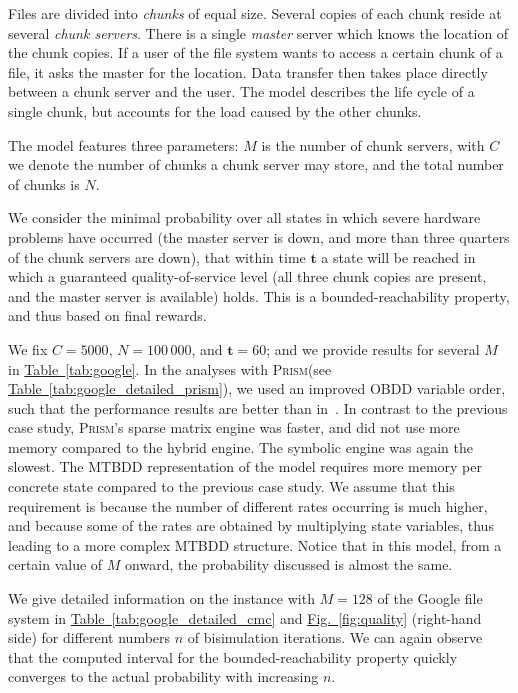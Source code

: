 \documentclass[10pt,twocolumn]{article}
\newcommand{\PRISM}{\textsc{Prism}\xspace}
\newcommand{\timeb}{\mathbf{t}}
\newcommand{\reffig}[1]{\texorpdfstring{\hyperref[fig:#1]{Fig.~\ref*{fig:#1}}}{Fig.~\ref*{fig:#1}}}
\newcommand{\reftab}[1]{\texorpdfstring{\hyperref[tab:#1]{Table~\ref*{tab:#1}}}{Table~\ref*{tab:#1}}}
\begin{document}
Files are divided into \emph{chunks} of equal size.  Several copies of
each chunk reside at several \emph{chunk servers}.  There is a single
\emph{master} server which knows the location of the chunk copies.  If
a user of the file system wants to access a certain chunk of a file,
it asks the master for the location.  Data transfer then takes place
directly between a chunk server and the user.  The model describes the
life cycle of a single chunk, but accounts for the load caused by the
other chunks.

The model features three parameters: $M$ is the number of chunk
servers, with $C$ we denote the number of chunks a chunk server may
store, and the total number of chunks is $N$.

We consider the minimal probability over all states in which severe
hardware problems have occurred (the master server is down, and more than
three quarters of the chunk servers are down), that within time
$\timeb$ a state will be reached in which a guaranteed
quality-of-service level (all three chunk copies are present, and the
master server is available) holds.  This is a bounded-reachability
property, and thus based on final rewards.

We fix $C=5000$, $N=100\,000$, and $\timeb=60$; and we provide results for
several $M$ in \reftab{google}. In the analyses with \PRISM (see \reftab{google_detailed_prism}), we used
an improved OBDD variable order, such that the performance results are
better than in~\cite{BaierHHHK12}. In contrast
to the previous case study, \PRISM's sparse matrix engine was faster, and
did not use more memory compared to the hybrid engine. The symbolic 
engine was again the slowest. The MTBDD representation of the model 
requires more memory per concrete state compared to the previous case 
study. We assume that this requirement is because the number of different rates 
occurring is much higher, and because some of the rates are obtained by multiplying
state variables, thus leading to a more complex MTBDD structure.
Notice that in this model, from a certain value of $M$ onward, the
probability discussed is almost the same.

We give detailed information on the instance with $M=128$ of the Google
file system in \reftab{google_detailed_cmc} and \reffig{quality} (right-hand side)
for different numbers $n$ of bisimulation iterations.
We can again observe that the computed interval for the bounded-reachability
property quickly converges to the actual probability with increasing $n$.
\end{document}

